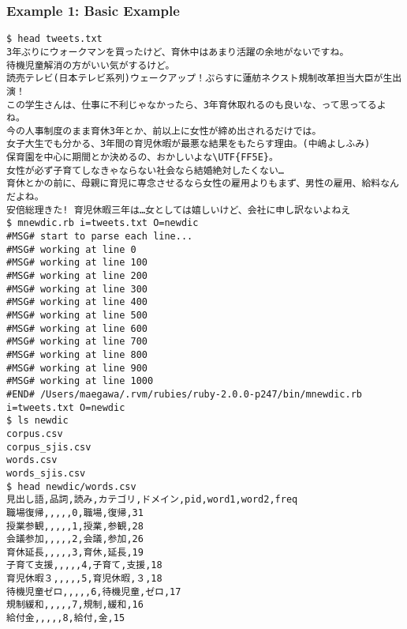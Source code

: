\subsubsection*{Example 1: Basic Example}



\begin{Verbatim}[baselinestretch=0.7,frame=single]
$ head tweets.txt
3年ぶりにウォークマンを買ったけど、育休中はあまり活躍の余地がないですね。
待機児童解消の方がいい気がするけど。
読売テレビ(日本テレビ系列)ウェークアップ！ぷらすに蓮舫ネクスト規制改革担当大臣が生出演！
この学生さんは、仕事に不利じゃなかったら、3年育休取れるのも良いな、って思ってるよね。
今の人事制度のまま育休3年とか、前以上に女性が締め出されるだけでは。
女子大生でも分かる、3年間の育児休暇が最悪な結果をもたらす理由。(中嶋よしふみ)
保育園を中心に期間とか決めるの、おかしいよな\UTF{FF5E}。
女性が必ず子育てしなきゃならない社会なら結婚絶対したくない…
育休とかの前に、母親に育児に専念させるなら女性の雇用よりもまず、男性の雇用、給料なんだよね。
安倍総理きた! 育児休暇三年は…女としては嬉しいけど、会社に申し訳ないよねえ
$ mnewdic.rb i=tweets.txt O=newdic
#MSG# start to parse each line...
#MSG# working at line 0
#MSG# working at line 100
#MSG# working at line 200
#MSG# working at line 300
#MSG# working at line 400
#MSG# working at line 500
#MSG# working at line 600
#MSG# working at line 700
#MSG# working at line 800
#MSG# working at line 900
#MSG# working at line 1000
#END# /Users/maegawa/.rvm/rubies/ruby-2.0.0-p247/bin/mnewdic.rb i=tweets.txt O=newdic
$ ls newdic
corpus.csv
corpus_sjis.csv
words.csv
words_sjis.csv
$ head newdic/words.csv
見出し語,品詞,読み,カテゴリ,ドメイン,pid,word1,word2,freq
職場復帰,,,,,0,職場,復帰,31
授業参観,,,,,1,授業,参観,28
会議参加,,,,,2,会議,参加,26
育休延長,,,,,3,育休,延長,19
子育て支援,,,,,4,子育て,支援,18
育児休暇３,,,,,5,育児休暇,３,18
待機児童ゼロ,,,,,6,待機児童,ゼロ,17
規制緩和,,,,,7,規制,緩和,16
給付金,,,,,8,給付,金,15
\end{Verbatim}
